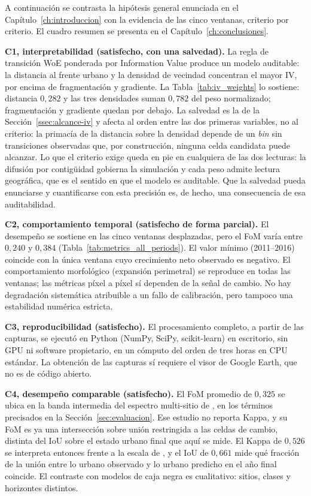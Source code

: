 A continuación se contrasta la hipótesis general enunciada en el Capítulo~\ref{ch:introduccion} con la evidencia de las cinco ventanas, criterio por criterio. El cuadro resumen se presenta en el Capítulo~\ref{ch:conclusiones}.

\textbf{C1, interpretabilidad (satisfecho, con una salvedad).} La regla de transición WoE ponderada por Information Value produce un modelo auditable: la distancia al frente urbano y la densidad de vecindad concentran el mayor IV, por encima de fragmentación y gradiente. La Tabla~\ref{tab:iv_weights} lo sostiene: distancia $0{,}282$ y las tres densidades suman $0{,}782$ del peso normalizado; fragmentación y gradiente quedan por debajo. La salvedad es la de la Sección~\ref{ssec:alcance-iv} y afecta al orden entre las dos primeras variables, no al criterio: la primacía de la distancia sobre la densidad depende de un \textit{bin} sin transiciones observadas que, por construcción, ninguna celda candidata puede alcanzar. Lo que el criterio exige queda en pie en cualquiera de las dos lecturas: la difusión por contigüidad gobierna la simulación y cada peso admite lectura geográfica, que es el sentido en que el modelo es auditable. Que la salvedad pueda enunciarse y cuantificarse con esta precisión es, de hecho, una consecuencia de esa auditabilidad.

\textbf{C2, comportamiento temporal (satisfecho de forma parcial).} El desempeño se sostiene en las cinco ventanas desplazadas, pero el FoM varía entre $0{,}240$ y $0{,}384$ (Tabla~\ref{tab:metrics_all_periods}). El valor mínimo (2011--2016) coincide con la única ventana cuyo crecimiento neto observado es negativo. El comportamiento morfológico (expansión perimetral) se reproduce en todas las ventanas; las métricas píxel a píxel sí dependen de la señal de cambio. No hay degradación sistemática atribuible a un fallo de calibración, pero tampoco una estabilidad numérica estricta.

\textbf{C3, reproducibilidad (satisfecho).} El procesamiento completo, a partir de las capturas, se ejecutó en Python (NumPy, SciPy, scikit-learn) en escritorio, sin GPU ni software propietario, en un cómputo del orden de tres horas en CPU estándar. La obtención de las capturas sí requiere el visor de Google Earth, que no es de código abierto.

\textbf{C4, desempeño comparable (satisfecho).} El FoM promedio de $0{,}325$ se ubica en la banda intermedia del espectro multi-sitio de \textcite{pontius2008comparing}, en los términos precisados en la Sección~\ref{sec:evaluacion}. Ese estudio no reporta Kappa, y su FoM es ya una intersección sobre unión restringida a las celdas de cambio, distinta del IoU sobre el estado urbano final que aquí se mide. El Kappa de $0{,}526$ se interpreta entonces frente a la escala de \textcite{LandisKoch1977}, y el IoU de $0{,}661$ mide qué fracción de la unión entre lo urbano observado y lo urbano predicho en el año final coincide. El contraste con modelos de caja negra es cualitativo: sitios, clases y horizontes distintos.

